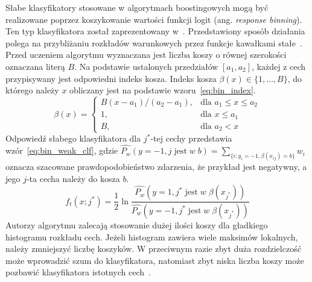 Słabe klasyfikatory stosowane w algorytmach boostingowych mogą być realizowane poprzez koszykowanie wartości funkcji logit (ang. \textit{response binning}).
Ten typ klasyfikatora został zaprezentowany w~\cite{1689652}.
Przedstawiony sposób działania polega na przybliżaniu rozkładów warunkowych przez funkcje kawałkami stałe~\cite{szybka_detekcja_klesk}.
Przed uczeniem algorytmu wyznaczana jest liczba koszy o równej szerokości oznaczana literą $B$.
Na podstawie ustalonych przedziałów $[a_1,a_2]$, każdej z cech przypisywany jest odpowiedni indeks kosza.
Indeks kosza $\beta(x) \in \{1,\dots,B\}$, do którego należy $x$ obliczany jest na podstawie wzoru~\eqref{eq:bin_index}.
\begin{equation}
    \label{eq:bin_index}
    \beta(x)=\left.
    \begin{cases}
        B(x - a_1)/(a_2-a_1), & \text{dla } a_1 \leq x \leq a_2 \\
        1, & \text{dla } x \leq a_1 \\
        B, & \text{dla } a_2 < x
    \end{cases}
    \right.
\end{equation}
Odpowiedź słabego klasyfikatora dla $j^*$-tej cechy przedstawia wzór~\eqref{eq:bin_weak_clf}, gdzie $\hat{P_w}(y=-1, j\;\text{jest}\;w\;b)=\sum_{\{i:y_i=-1,\beta(x_{ij})=b\}}^{} w_i$ oznacza szacowane prawdopodobieństwo zdarzenia, że przykład jest negatywny, a jego $j$-ta cecha należy do kosza $b$.
\begin{equation}
    \label{eq:bin_weak_clf}
    f_t(x;j^*) = \dfrac{1}{2} \ln\dfrac{\hat{P_w}(y=1, j^*\;\text{jest}\;w\;\beta(x_{j^*}))}{\hat{P_w}(y=-1, j^*\;\text{jest}\;w\;\beta(x_{j^*}))}
\end{equation}
Autorzy algorytmu zalecają stosowanie dużej ilości koszy dla gładkiego histogramu rozkładu cech.
Jeżeli histogram zawiera wiele maksimów lokalnych, należy zmniejszyć liczbę koszyków.
W przeciwnym razie zbyt duża rozdzielczość może wprowadzić szum do klasyfikatora, natomiast zbyt niska liczba koszy może pozbawić klasyfikatora istotnych cech~\cite{1689652}.


